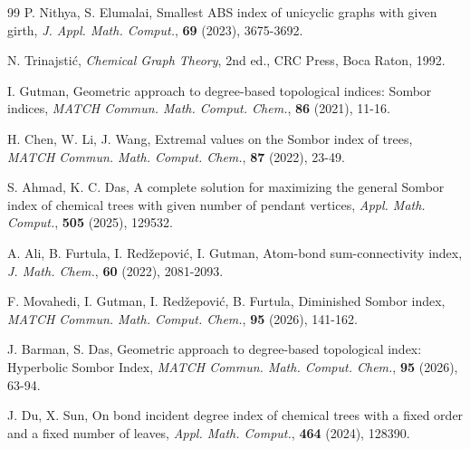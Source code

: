 \documentclass[12pt]{article}
\theoremstyle{definition}
\begin{document}
\begin{thebibliography}{99}
P. Nithya, S. Elumalai, Smallest ABS index of unicyclic graphs with given girth, \textit{J. Appl. Math. Comput.}, \textbf{69} (2023), 3675-3692.

N. Trinajstić, \textit{Chemical Graph Theory}, 2nd ed., CRC Press, Boca Raton, 1992.

I. Gutman, Geometric approach to degree-based topological indices: Sombor indices, \textit{MATCH Commun. Math. Comput. Chem.}, \textbf{86} (2021), 11-16.

H. Chen, W. Li, J. Wang, Extremal values on the Sombor index of trees, \textit{MATCH Commun. Math. Comput. Chem.}, \textbf{87} (2022), 23-49.

S. Ahmad, K. C. Das, A complete solution for maximizing the general Sombor index of chemical trees with given number of pendant vertices, \textit{Appl. Math. Comput.}, \textbf{505} (2025), 129532.

A. Ali, B. Furtula, I. Redžepović, I. Gutman, Atom-bond sum-connectivity index, \textit{J. Math. Chem.}, \textbf{60} (2022), 2081-2093.

F. Movahedi, I. Gutman, I. Redžepović, B. Furtula, Diminished Sombor index, \textit{MATCH Commun. Math. Comput. Chem.}, \textbf{95} (2026), 141-162.

J. Barman, S. Das, Geometric approach to degree-based topological index: Hyperbolic Sombor Index, \textit{MATCH Commun. Math. Comput. Chem.}, \textbf{95} (2026), 63-94.

J. Du, X. Sun, On bond incident degree index of chemical trees with a fixed order and a fixed number of leaves, \textit{Appl. Math. Comput.}, \textbf{464} (2024), 128390.

\end{thebibliography}
\end{document}
